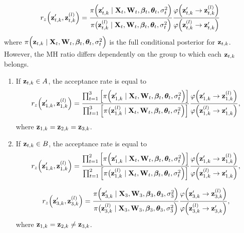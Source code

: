 \documentclass[a4paper, 11pt]{report}
\begin{document}
\begin{enumerate}
\begin{equation*}
    r_z \Big( {\bf z}^\prime_{t,k},{\bf z}^{(l)}_{t,k} \Big) = \frac{\pi \Big( {\bf z}^\prime_{t,k} \mid {\bf X}_t,{\bf W}_t,{\boldsymbol \beta}_t,{\boldsymbol \theta}_t,\sigma^2_t \Big)}{\pi \big( {\bf z}^{(l)}_{t,k} \mid {\bf X}_t,{\bf W}_t,{\boldsymbol \beta}_t,{\boldsymbol \theta}_t,\sigma^2_t\Big)}\frac{\varphi \Big({\bf z}^\prime_{t,k}\rightarrow {\bf z}^{(l)}_{t,k} \Big)}{\varphi \Big({\bf z}^{(l)}_{t,k}\rightarrow {\bf z}^\prime_{t,k} \Big)}
\end{equation*}
where $\pi \Big( {\bf z}_{t,k} \mid {\bf X}_t,{\bf W}_t,{\boldsymbol \beta}_t,{\boldsymbol \theta}_t,\sigma^2_t \Big)$ is the full conditional posterior for ${\bf z}_{t,k}$. However, the MH ratio differs dependently on the group to which each ${\bf z}_{t,k}$ belongs.

\begin{enumerate}
    \item  If ${\bf z}_{t,k} \in A$, the acceptance rate is equal to
    \begin{equation*}
    r_z \Big( {\bf z}^\prime_{1,k},{\bf z}^{(l)}_{1,k} \Big) = \frac{\prod^3_{t=1} \Big[ \pi \Big( {\bf z}^\prime_{1,k} \mid {\bf X}_t,{\bf W}_t,{\boldsymbol \beta}_t,{\boldsymbol \theta}_t,\sigma^2_t \Big)\Big]}{\prod^3_{t=1} \Big[ \pi \big( {\bf z}^{(l)}_{1,k} \mid {\bf X}_t,{\bf W}_t,{\boldsymbol \beta}_t,{\boldsymbol \theta}_t,\sigma^2_t\Big) \Big]}\frac{\varphi \Big({\bf z}^\prime_{1,k}\rightarrow {\bf z}^{(l)}_{1,k} \Big)}{\varphi \Big({\bf z}^{(l)}_{1,k}\rightarrow {\bf z}^\prime_{1,k} \Big)},
    \end{equation*}
    where ${\bf z}_{1,k} = {\bf z}_{2,k} = {\bf z}_{3,k}$.
    
    \item If ${\bf z}_{t,k} \in B$, the acceptance rate is equal to
    \begin{equation*}
    r_z \Big( {\bf z}^\prime_{1,k},{\bf z}^{(l)}_{1,k} \Big) = \frac{\prod^2_{t=1} \Big[ \pi \Big( {\bf z}^\prime_{1,k} \mid {\bf X}_t,{\bf W}_t,{\boldsymbol \beta}_t,{\boldsymbol \theta}_t,\sigma^2_t \Big)\Big]}{\prod^2_{t=1} \Big[ \pi \big( {\bf z}^{(l)}_{1,k} \mid {\bf X}_t,{\bf W}_t,{\boldsymbol \beta}_t,{\boldsymbol \theta}_t,\sigma^2_t\Big) \Big]}\frac{\varphi \Big({\bf z}^\prime_{1,k}\rightarrow {\bf z}^{(l)}_{1,k} \Big)}{\varphi \Big({\bf z}^{(l)}_{1,k}\rightarrow {\bf z}^\prime_{1,k} \Big)},
    \end{equation*}
    
    \begin{equation*}
    r_z \Big( {\bf z}^\prime_{3,k},{\bf z}^{(l)}_{3,k} \Big) = \frac{\pi \Big( {\bf z}^\prime_{3,k} \mid {\bf X}_3,{\bf W}_3,{\boldsymbol \beta}_3,{\boldsymbol \theta}_3,\sigma^2_3 \Big)}{\pi \big( {\bf z}^{(l)}_{3,k} \mid {\bf X}_3,{\bf W}_3,{\boldsymbol \beta}_3,{\boldsymbol \theta}_3,\sigma^2_3\Big) }\frac{\varphi \Big({\bf z}^\prime_{3,k}\rightarrow {\bf z}^{(l)}_{3,k} \Big)}{\varphi \Big({\bf z}^{(l)}_{3,k}\rightarrow {\bf z}^\prime_{3,k} \Big)},
    \end{equation*}
    where ${\bf z}_{1,k} = {\bf z}_{2,k} \neq {\bf z}_{3,k} $.
    

\end{enumerate}
\end{enumerate}
\end{document}
